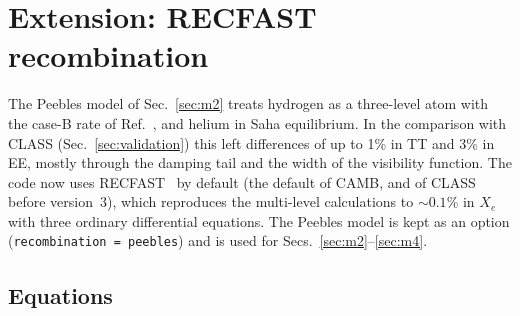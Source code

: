 \section{Extension: RECFAST recombination}\label{sec:recfast}

The Peebles model of Sec.~\ref{sec:m2} treats hydrogen as a three-level atom with the case-B rate of
Ref.~\cite{Callin2006}, and helium in Saha equilibrium. In the comparison with CLASS (Sec.~\ref{sec:validation}) this
left differences of up to 1\% in TT and 3\% in EE, mostly through the damping tail and the width of the visibility
function. The code now uses RECFAST~\cite{Seager1999,Wong2008,RubinoMartin2010} by default (the default of CAMB, and of CLASS before
version~3), which reproduces the multi-level calculations to $\sim0.1\%$ in $X_e$ with three
ordinary differential equations. The Peebles model is kept as an option (\texttt{recombination = peebles}) and is
used for Secs.~\ref{sec:m2}--\ref{sec:m4}.

\subsection{Equations}

